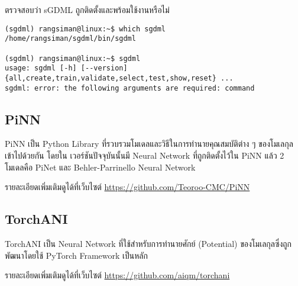\vspace{1em}
\noindent ตรวจสอบว่า sGDML ถูกติดตั้งและพร้อมใช้งานหรือไม่

\begin{lstlisting}[style=MyBash]
(sgdml) rangsiman@linux:~$ which sgdml
/home/rangsiman/sgdml/bin/sgdml

(sgdml) rangsiman@linux:~$ sgdml
usage: sgdml [-h] [--version] {all,create,train,validate,select,test,show,reset} ...
sgdml: error: the following arguments are required: command
\end{lstlisting}

\subsection{PiNN}
\label{ssec:lib_pinn}

PiNN\autocite{shao2020} เป็น Python Library ที่รวบรวมโมเดลและวิธีในการทำนายคุณสมบัติต่าง ๆ ของโมเลกุลเข้าไปด้วยกัน โดยใน%
เวอร์ชันปัจจุบันนั้นมี Neural Network ที่ถูกติดตั้งไว้ใน PiNN แล้ว 2 โมเดลคือ PiNet และ Behler-Parrinello Neural Network

รายละเอียดเพิ่มเติมดูได้ที่เว็บไซต์ \url{https://github.com/Teoroo-CMC/PiNN}

\subsection{TorchANI}
\label{ssec:lib_torchani}

TorchANI\autocite{gao2020} เป็น Neural Network ที่ใช้สำหรับการทำนายศักย์ (Potential) ของโมเลกุลซึ่งถูกพัฒนาโดยใช้ PyTorch 
Framework เป็นหลัก 

รายละเอียดเพิ่มเติมดูได้ที่เว็บไซต์ \url{https://github.com/aiqm/torchani}
